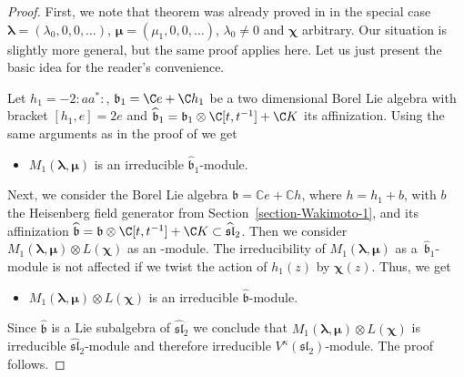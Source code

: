 \documentclass[10pt,a4paper]{amsart}
\numberwithin{equation}{section}
\theoremstyle{definition}
\newcommand{\1}{\textbf{1}}
\begin{document}
\begin{proof} First, we note that theorem was already proved in \cite[Theorem 10.4]{ALZ-16} in the special case $\bm{\lambda} = (\lambda_0, 0, 0, \dots )$, $\bm{\mu} = (\mu_1, 0, 0, \dots )$, $\lambda_0 \ne 0$ and $\bm{\chi}$ arbitrary. Our situation is slightly more general, but the same proof applies here. Let us just present the basic idea for the reader’s convenience.

 Let $ h_1 =-2 {:} a a^*{:}$, ${\mathfrak b}_1 = {\C} e + {\C} h_1$ be a two dimensional Borel Lie algebra with bracket
$[h_1, e] = 2 e$ and
$\widehat {{\mathfrak b}} _1 = {\mathfrak b}_1 \otimes {\C}[t, t^{-1}] + {\C} K$ its affinization. Using the same arguments as in the proof of \cite[Proposition~10.2]{ALZ-16} we get
\begin{itemize}\itemsep=0pt
\item $M_1(\bm{\lambda}, \bm{\mu})$ is an irreducible $\widehat {{\mathfrak b}} _1$-module.
\end{itemize}

Next, we consider the Borel Lie algebra $\mathfrak b=\mathbb C e+\mathbb C h$, where
$h=h_1+b$,
with $b$ the Heisenberg field generator from Section~\ref{section-Wakimoto-1}, and its affinization $\widehat{ \mathfrak b} = {\mathfrak b} \otimes {\C} [t,t^{-1}] + {\C} K \subset \widehat {\mathfrak{sl}}_2$. Then we consider $M_1 (\bm{\lambda}, \bm{\mu}) \otimes L (\bm{\chi})$ as an -module. The irreducibility of $M_1(\bm{\lambda}, \bm{\mu})$ as a~$\widehat {{\mathfrak b}} _1$\nobreakdash-mod\-ule is not affected if we twist the action of $h_1(z)$ by $\bm{\chi}(z)$.
Thus, we get
\begin{itemize}\itemsep=0pt
\item $ M_1(\bm{\lambda}, \bm{\mu}) \otimes L(\bm{\chi})$ is an irreducible $\widehat{ \mathfrak b}$-module.
\end{itemize}
 Since $\widehat{ \mathfrak b} $ is a Lie subalgebra of $ \widehat {\mathfrak{sl}}_2$ we conclude that $M_1(\bm{\lambda}, \bm{\mu}) \otimes L(\bm{\chi})$ is irreducible $ \widehat {\mathfrak{sl}}_2$-module and therefore irreducible $V^{\kappa} (\mathfrak{sl}_2)$-module. The proof follows.
 \end{proof}
\end{document}
